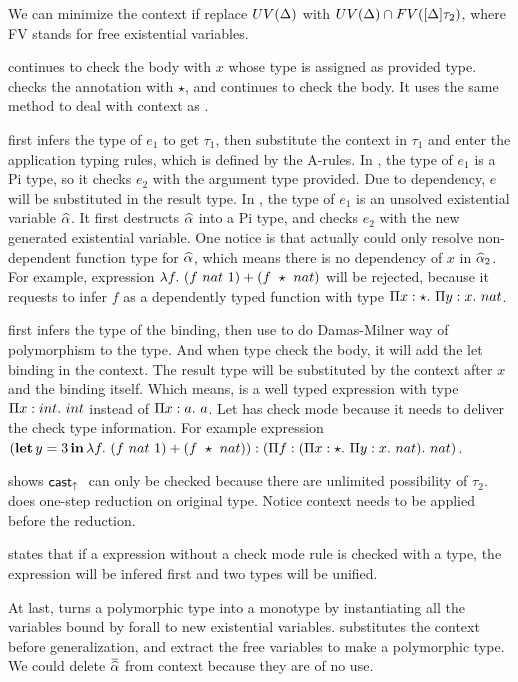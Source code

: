 We can minimize the context if replace $UV(\Delta)$ with $UV(\Delta) \cap FV([\Delta]\tau_2)$, where FV stands for free existential variables.

 continues to check the body with $x$ whose type is assigned as provided type.  checks the annotation with $\star$, and continues to check the body. It uses the same method to deal with context as .

 first infers the type of $e_1$ to get $\tau_1$, then substitute the context in $\tau_1$ and enter the application typing rules, which is defined by the A-rules. In , the type of $e_1$ is a Pi type, so it checks $e_2$ with the argument type provided. Due to dependency, $e$ will be substituted in the result type. In , the type of $e_1$ is an unsolved existential variable $\widehat{\alpha}$. It first destructs $\widehat{\alpha}$ into a Pi type, and checks $e_2$ with the new generated existential variable. One notice is that  actually could only resolve non-dependent function type for $\widehat{\alpha}$, which means there is no dependency of $x$ in $\widehat{\alpha}_2$. For example, expression $\lambda {f}.~ {(f~nat~1) + (f~\star~nat)}$ will be rejected, because it requests to infer $f$ as a dependently typed function with type $\Pi x:\star.~ {\Pi y:x.~} nat$.

 first infers the type of the binding, then use  to do Damas-Milner way of polymorphism to the type. And when type check the body, it will add the let binding in the context. The result type will be substituted by the context after $x$ and the binding itself. Which means,  is a well typed expression with type $\Pi x:int.~ {int}$ instead of $\Pi x:a.~ a $.  Let has check mode because it needs to deliver the check type information. For example expression $(\operatorname{\mathbf{let}} y = 3 \operatorname{\mathbf{in}} \lambda {f}.~ {(f~nat~1) + (f~\star~nat))}: (\Pi f:(\Pi x:\star.~ {\Pi y:x.~ nat}).~ nat)$.

 shows $\mathsf{cast}_\uparrow~$ can only be checked because there are unlimited possibility of $\tau_2$.  does one-step reduction on original type. Notice context needs to be applied before the reduction.

 states that if a expression without a check mode rule is checked with a type, the expression will be infered first and two types will be unified.

At last,  turns a polymorphic type into a monotype by instantiating all the variables bound by forall to new existential variables.  substitutes the context before generalization, and extract the free variables to make a polymorphic type. We could delete $\overbar{\genA}$ from context because they are of no use.

